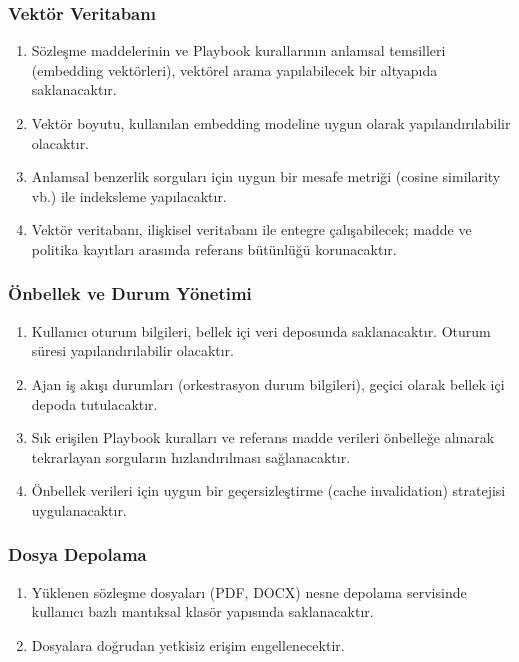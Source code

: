 \documentclass[12pt, a4paper]{article}
\begin{document}
\subsubsection{Vektör Veritabanı}
\begin{enumerate}[leftmargin=2cm]
    \item Sözleşme maddelerinin ve Playbook kurallarının anlamsal temsilleri (embedding vektörleri), vektörel arama yapılabilecek bir altyapıda saklanacaktır.
    \item Vektör boyutu, kullanılan embedding modeline uygun olarak yapılandırılabilir olacaktır.
    \item Anlamsal benzerlik sorguları için uygun bir mesafe metriği (cosine similarity vb.) ile indeksleme yapılacaktır.
    \item Vektör veritabanı, ilişkisel veritabanı ile entegre çalışabilecek; madde ve politika kayıtları arasında referans bütünlüğü korunacaktır.
\end{enumerate}

\subsubsection{Önbellek ve Durum Yönetimi}
\begin{enumerate}[leftmargin=2cm]
    \item Kullanıcı oturum bilgileri, bellek içi veri deposunda saklanacaktır. Oturum süresi yapılandırılabilir olacaktır.
    \item Ajan iş akışı durumları (orkestrasyon durum bilgileri), geçici olarak bellek içi depoda tutulacaktır.
    \item Sık erişilen Playbook kuralları ve referans madde verileri önbelleğe alınarak tekrarlayan sorguların hızlandırılması sağlanacaktır.
    \item Önbellek verileri için uygun bir geçersizleştirme (cache invalidation) stratejisi uygulanacaktır.
\end{enumerate}

\subsubsection{Dosya Depolama}
\begin{enumerate}[leftmargin=2cm]
    \item Yüklenen sözleşme dosyaları (PDF, DOCX) nesne depolama servisinde kullanıcı bazlı mantıksal klasör yapısında saklanacaktır.
    \item Dosyalara doğrudan yetkisiz erişim engellenecektir.
\end{enumerate}
\end{document}

